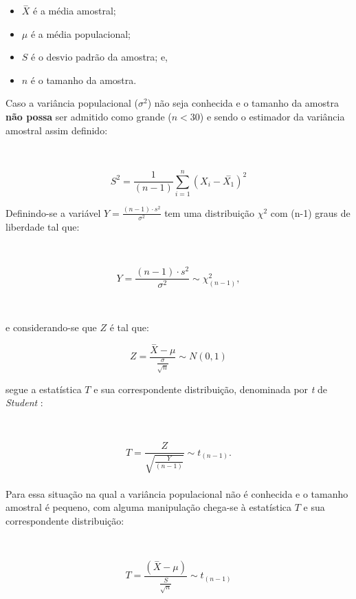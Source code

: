 \documentclass[
]{book}
\providecommand{\tightlist}{%
  \setlength{\itemsep}{0pt}\setlength{\parskip}{0pt}}
\begin{document}
\hfill\break

\begin{itemize}
\tightlist
\item
  \(\stackrel{-}{X}\) é a média amostral;\\
\item
  \(\mu\) é a média populacional;\\
\item
  \(S\) é o desvio padrão da amostra; e,\\
\item
  \(n\) é o tamanho da amostra.
\end{itemize}

\hfill\break

Caso a variância populacional (\(\sigma^{2}\)) não seja conhecida e o tamanho da amostra \textbf{não possa} ser admitido como grande (\(n<30\)) e sendo o estimador da variância amostral assim definido:

~

\[
{S}^{2}=\frac{1}{\left(n-1\right)}\sum _{i=1}^{n}{\left({X}_{i}-\stackrel{-}{{X}_{1}}\right)}^{2}
\]

\hfill\break

Definindo-se a variável \(Y = \frac{(n-1)\cdot s^{2}}{\sigma^{2}}\) tem uma distribuição \(\chi^{2}\) com (n-1) graus de liberdade tal que:

~

\[
Y = \frac{(n-1)\cdot s^{2}}{\sigma^{2}} \sim \chi^{2}_{(n-1)},
\]

~

e considerando-se que \(Z\) é tal que:
~

\[
Z = \frac{\stackrel{-}{X} - \mu}{\frac{\sigma}{\sqrt{n}}}  \sim N(0 ,1)
\]

\hfill\break

segue a estatística \(T\) e sua correspondente distribuição, denominada por \emph{t} de \emph{Student} :

~

\[
T=\frac{Z}{\sqrt{\frac{Y}{\left(n-1\right)}}} \sim {t}_{\left(n-1\right)}.
\]\\

Para essa situação na qual a variância populacional não é conhecida e o tamanho amostral é pequeno, com alguma manipulação chega-se à estatística \(T\) e sua correspondente distribuição:

~

\[
T = \frac{(\stackrel{-}{X} - \mu)}{    \frac{S}{\sqrt{n}} } \sim t_{(n-1)}
\]

\hfill\break
\end{document}
